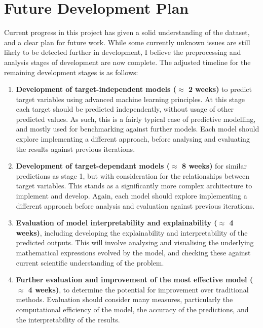 \chapter{Future Development Plan}\label{C:conclusion}

Current progress in this project has given a solid understanding of the dataset, and a clear plan for future work. While some currently unknown issues are still likely to be detected further in development, I believe the preprocessing and analysis stages of development are now complete. The adjusted timeline for the remaining development stages is as follows:

\begin{enumerate}
        \item \textbf{Development of target-independent models ($\approx$ 2 weeks)} to predict target variables using advanced machine learning principles. At this stage each target should be predicted independently, without usage of other predicted values. As such, this is a fairly typical case of predictive modelling, and mostly used for benchmarking against further models. Each model should explore implementing a different approach, before analysing and evaluating the results against previous iterations.

    \item \textbf{Development of target-dependant models ($\approx$ 8 weeks)} for similar predictions as stage 1, but with consideration for the relationships between target variables. This stands as a significantly more complex architecture to implement and develop.  Again, each model should explore implementing a different approach before analysis and evaluation against previous iterations. 

    \item \textbf{Evaluation of model interpretability and explainability ($\approx$ 4 weeks)}, including developing the explainability and interpretability of the predicted outputs.  This will involve analysing and visualising the underlying mathematical expressions evolved by the model, and checking these against current scientific understanding of the problem.

    \item \textbf{Further evaluation and improvement of the most effective model ($\approx$ 4 weeks)}, to determine the potential for improvement over traditional methods. Evaluation should consider many measures, particularly the computational efficiency of the model, the accuracy of the predictions, and the interpretability of the results.
\end{enumerate}
